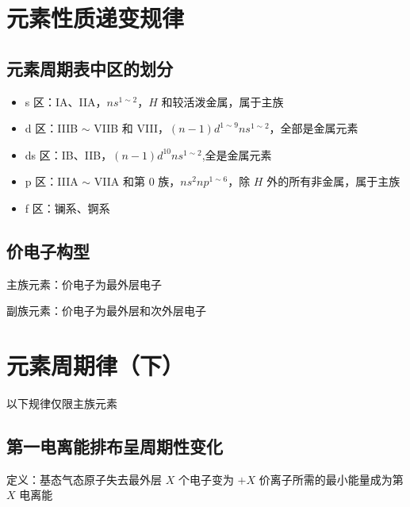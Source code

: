 \documentclass[UTF8,zihao=-4,openany]{ctexbook}
\begin{document}
\section{元素性质递变规律}
\subsection{元素周期表中区的划分}
\begin{itemize}
\item s 区：IA、IIA，$ns^{1\sim2}$，$H$ 和较活泼金属，属于主族
\end{itemize}

\begin{itemize}
\item d 区：IIIB $\sim$ VIIB 和 VIII，$(n-1)d^{1\sim9}ns^{1\sim2}$，全部是金属元素
\end{itemize}

\begin{itemize}
\item ds 区：IB、IIB，$(n-1)d^{10}ns^{1\sim2}$,全是金属元素
\end{itemize}

\begin{itemize}
\item p 区：IIIA $\sim$ VIIA 和第 $0$ 族，$ns^2np^{1\sim6}$，除 $H$ 外的所有非金属，属于主族
\end{itemize}

\begin{itemize}
\item f 区：镧系、锕系
\end{itemize}
\subsection{价电子构型}
主族元素：价电子为最外层电子\par

副族元素：价电子为最外层和次外层电子\par
\section{元素周期律（下）}
以下规律仅限主族元素\par

\subsection{第一电离能排布呈周期性变化}
定义：基态气态原子失去最外层 $X$ 个电子变为 $+X$ 价离子所需的最小能量成为第 $X$ 电离能\par
\end{document}
